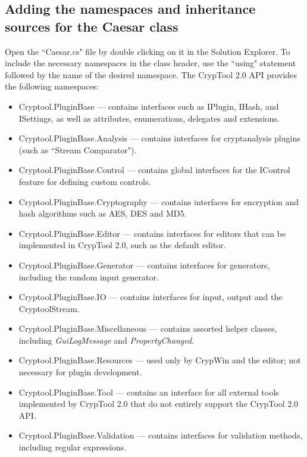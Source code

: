 \subsection{Adding the namespaces and inheritance sources for the Caesar class}
\label{sec:AddingTheNamespacesAndInheritanceSourcesForTheCaesarClass}

Open the ``Caesar.cs" file by double clicking on it in the Solution Explorer. To include the necessary namespaces in the class header, use the ``using" statement followed by the name of the desired namespace. The CrypTool 2.0 API provides the following namespaces:

\begin{itemize}
	\item Cryptool.PluginBase --- contains interfaces such as IPlugin, IHash, and ISettings, as well as attributes, enumerations, delegates and extensions.
	\item Cryptool.PluginBase.Analysis --- contains interfaces for cryptanalysis plugins (such as ``Stream Comparator").
	\item Cryptool.PluginBase.Control --- contains global interfaces for the IControl feature for defining custom controls.
	\item Cryptool.PluginBase.Cryptography --- contains interfaces for encryption and hash algorithms such as AES, DES and MD5.
	\item Cryptool.PluginBase.Editor --- contains interfaces for editors that can be implemented in CrypTool 2.0, such as the default editor.
	\item Cryptool.PluginBase.Generator --- contains interfaces for generators, including the random input generator.
	\item Cryptool.PluginBase.IO --- contains interfaces for input, output and the CryptoolStream.
	\item Cryptool.PluginBase.Miscellaneous --- contains assorted helper classes, including \textit{GuiLogMessage} and \textit{PropertyChanged}.
	\item Cryptool.PluginBase.Resources --- used only by CrypWin and the editor; not necessary for plugin development.
	\item Cryptool.PluginBase.Tool --- contains an interface for all external tools implemented by CrypTool 2.0 that do not entirely support the CrypTool 2.0 API.
	\item Cryptool.PluginBase.Validation --- contains interfaces for validation methods, including regular expressions.
\end{itemize}

